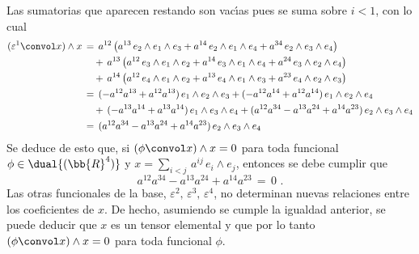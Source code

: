 %
Las sumatorias que aparecen restando son vac\'{\i}as pues se suma sobre
$i<1$, con lo cual
\begin{align*}
	(\varepsilon^{1}\convol x)\wedge x & \,=\,
		a^{12}\,\big( a^{13}\,e_{2}\wedge e_{1}\wedge e_{3} +
			a^{14}\,e_{2}\wedge e_{1}\wedge e_{4} +
			a^{34}\,e_{2}\wedge e_{3}\wedge e_{4}\big) \\
	& \quad\,+\,a^{13}\,\big( a^{12}\,e_{3}\wedge e_{1}\wedge e_{2} +
			a^{14}\,e_{3}\wedge e_{1}\wedge e_{4} +
			a^{24}\,e_{3}\wedge e_{2}\wedge e_{4}\big) \\
	& \quad\,+\,a^{14}\,\big( a^{12}\,e_{4}\wedge e_{1}\wedge e_{2} +
			a^{13}\,e_{4}\wedge e_{1}\wedge e_{3} +
			a^{23}\,e_{4}\wedge e_{2}\wedge e_{3}\big) \\
	& \,=\, (-a^{12}a^{13}+a^{12}a^{13})\,e_{1}\wedge e_{2}\wedge e_{3} +
		(-a^{12}a^{14}+a^{12}a^{14})\,e_{1}\wedge e_{2}\wedge e_{4} \\
	& \quad\,+\,
		(-a^{13}a^{14}+a^{13}a^{14})\,e_{1}\wedge e_{3}\wedge e_{4} +
		(a^{12}a^{34}-a^{13}a^{24}+a^{14}a^{23})\,
			e_{2}\wedge e_{3}\wedge e_{4} \\
	& \,=\,	(a^{12}a^{34}-a^{13}a^{24}+a^{14}a^{23})\,
			e_{2}\wedge e_{3}\wedge e_{4}
\end{align*}
%
Se deduce de esto que, si $(\phi\convol x)\wedge x=0$ para toda funcional
$\phi\in\dual{(\bb{R}^{4})}$ y $x=\sum_{i<j}\,a^{ij}\,e_{i}\wedge e_{j}$,
entonces se debe cumplir que
\begin{equation}
	\label{eq:pluckerparaplanos}
	a^{12}a^{34}-a^{13}a^{24}+a^{14}a^{23} \,=\,0
	\text{ .}
\end{equation}
%
Las otras funcionales de la base, $\varepsilon^{2},\,\varepsilon^{3},\,%
\varepsilon^{4}$, no determinan nuevas relaciones entre los coeficientes
de $x$. De hecho, asumiendo se cumple la igualdad anterior, se
puede deducir que $x$ es un tensor elemental y que por lo tanto
$(\phi\convol x)\wedge x=0$ para toda funcional $\phi$.

